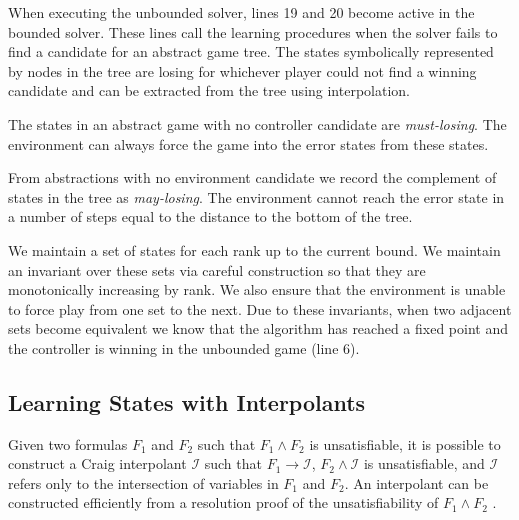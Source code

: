 \documentclass{llncs}
\begin{document}
When executing the unbounded solver, lines 19 and 20 become active in the
bounded solver. These lines call the learning procedures when the solver fails
to find a candidate for an abstract game tree. The states symbolically
represented by nodes in the tree are losing for whichever player could not find
a winning candidate and can be extracted from the tree using interpolation.

The states in an abstract game with no controller candidate are
\emph{must-losing}. The environment can always force the game into the error
states from these states.

From abstractions with no environment candidate we record the complement of
states in the tree as \emph{may-losing}. The environment cannot reach the error
state in a number of steps equal to the distance to the bottom of the tree.

We maintain a set of states for each rank up to the current bound. We maintain
an invariant over these sets via careful construction so that they are
monotonically increasing by rank. We also ensure that the environment is unable
to force play from one set to the next. Due to these invariants, when two
adjacent sets become equivalent we know that the algorithm has reached a fixed
point and the controller is winning in the unbounded game (line 6).



\subsection{Learning States with Interpolants}

Given two formulas $F_1$ and $F_2$ such that $F_1 \land F_2$ is unsatisfiable,
it is possible to construct a Craig interpolant\cite{craig1957} $\mathcal{I}$
such that $F_1 \to \mathcal{I}$, $F_2 \land \mathcal{I}$ is unsatisfiable, and
$\mathcal{I}$ refers only to the intersection of variables in $F_1$ and $F_2$.
An interpolant can be constructed efficiently from a resolution proof of the
unsatisfiability of $F_1 \land F_2$ \cite{pudlak1997}.
\end{document}
